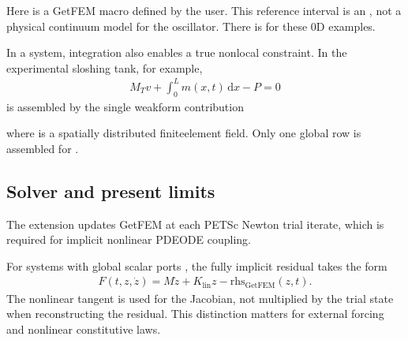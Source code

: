 \documentclass[letterpaper,10pt,english]{sphinxmanual}
\begin{document}
\sphinxAtStartPar
Here  is a GetFEM macro defined by the user. This reference
interval is an , not a physical continuum
model for the oscillator. There is 
for these 0D examples.

\sphinxAtStartPar
In a  system, integration also enables a true
nonlocal constraint. In the experimental sloshing tank, for example,
\begin{equation*}
\begin{split}M_T v + \int_0^L m(x,t)\,\mathrm dx - P = 0\end{split}
\end{equation*}
\sphinxAtStartPar
is assembled by the single weak\sphinxhyphen{}form contribution

\begin{sphinxVerbatim}[commandchars=\\\{\}]
         \PYG{p}{[}\PYG{p}{]}
\end{sphinxVerbatim}

\sphinxAtStartPar
where  is a spatially distributed finite\sphinxhyphen{}element field.
Only one global row is assembled for .


\subsection{Solver and present limits}
\label{\detokenize{lumped:solver-and-present-limits}}
\sphinxAtStartPar
The extension updates GetFEM at each PETSc Newton trial iterate,
which is required for implicit nonlinear PDE\textendash{}ODE coupling.

\sphinxAtStartPar
For systems with global scalar ports , the fully implicit residual takes the form
\begin{equation*}
\begin{split}F(t,z,\dot z)=M\dot z + K_{\mathrm{lin}}z
             - \mathrm{rhs}_{\mathrm{GetFEM}}(z,t).\end{split}
\end{equation*}
\sphinxAtStartPar
The nonlinear tangent is used for the Jacobian, not multiplied by
the trial state when reconstructing the residual. This distinction
matters for external forcing and nonlinear constitutive laws.
\end{document}
